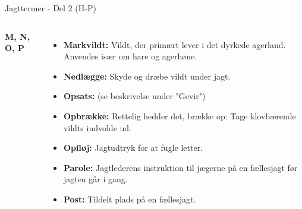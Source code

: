 \begin{frame}{Jagttermer - Del 2 (H-P)}
\begin{columns}[T]
    \textbf{\large M, N, O, P}
    \setlength{\parskip}{0.1em} %
    \scriptsize %
    \RaggedRight
    \begin{itemize}
        \item \textbf{Markvildt:} Vildt, der primært lever i det dyrkede agerland. Anvendes især om hare og agerhøne.
        \item \textbf{Nedlægge:} Skyde og dræbe vildt under jagt.
        \item \textbf{Opsats:} (se beskrivelse under "Gevir")
        \item \textbf{Opbrække:} Rettelig hedder det, brække op: Tage klovbærende vildts indvolde ud.
        \item \textbf{Opfløj:} Jagtudtryk for at fugle letter.
        \item \textbf{Parole:} Jagtlederens instruktion til jægerne på en fællesjagt før jagten går i gang.
        \item \textbf{Post:} Tildelt plads på en fællesjagt.
    \end{itemize}
\end{columns}

\end{frame}